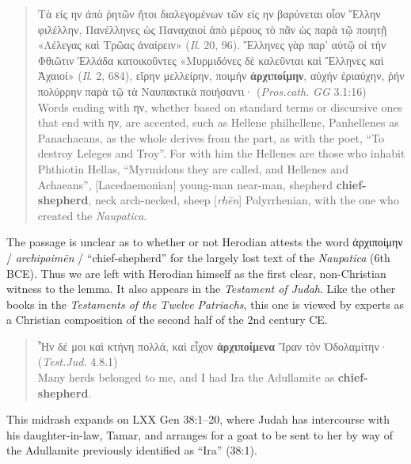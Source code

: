 \vspace*{4mm} 
 \begin{quote} Τὰ εἰς ην ἀπὸ ῥητῶν ἤτοι διαλεγομένων τῶν εἰς ην βαρύνεται %
 οἷον Ἕλλην φιλέλλην, Πανέλληνες ὡς Παναχαιοί ἀπὸ μέρους τὸ %
 πᾶν ὡς παρὰ τῷ ποιητῇ «Λέλεγας καὶ Τρῶας ἀναίρειν» (\textit{Il}. 20, 96).
 Ἕλληνες γὰρ παρ’ αὐτῷ οἱ τὴν Φθιῶτιν Ἑλλάδα κατοικοῦντες %
 «Μυρμιδόνες δὲ καλεῦνται καὶ Ἕλληνες καὶ Ἀχαιοί» (\textit{Il}. 2, 684), %
 εἴρην μελλείρην, ποιμήν \textbf{ἀρχιποίμην}, αὐχήν ἐριαύχην, %
 ῥήν πολύρρην παρὰ τῷ τὰ Ναυπακτικὰ ποιήσαντι· (\textit{Pros.cath.} \textit{GG} 3.1:16) \\[2mm] %
 Words ending with ην, whether based on standard terms or discursive ones %
 that end with ην, are accented, such as Hellene philhellene, %
 Panhellenes as Panachaeans, as the whole derives from the part, %
 as with the poet, “To destroy Leleges and Troy”. %
 For with him the Hellenes are those who inhabit Phthiotin Hellas, %
 “Myrmidons they are called, and Hellenes and Achaeans”, %
 [Lacedaemonian] young-man near-man, shepherd \textbf{chief-shepherd}, neck arch-necked, %
 sheep [\textit{rhēn}] Polyrrhenian, with the one who created the \textit{Naupatica}.\end{quote} %
 \vspace*{4mm}

The passage is unclear as to whether or not Herodian attests the word ἀρχιποίμην / \textit{archipoimēn} / “chief-shepherd” %
for the largely lost text of the \textit{Naupatica} (6th BCE). %
Thus we are left with Herodian himself as the first clear, non-Christian witness to the lemma. %
It also appears in the \textit{Testament of Judah}. %
Like the other books in the \textit{Testaments of the Twelve Patriachs}, %
this one is viewed by experts as a Christian composition of the second half of the 2nd century CE. %
\clearpage

 \begin{quote}Ἦν δέ μοι καὶ κτήνη πολλά, %
 καὶ εἶχον \textbf{ἀρχιποίμενα} Ἵραν τὸν Ὀδολαμίτην· (\textit{Test.Jud.} 4.8.1) \\[0.4mm] %
 Many herds belonged to me, 
 and I had Ira the Adullamite as \textbf{chief-shepherd}. \end{quote} %
 \vspace*{3mm}

\noindent{}This midrash expands on LXX Gen 38:1--20, %
where Judah has intercourse with his daughter-in-law, Tamar, %
and arranges for a goat to be sent to her by way of the %
Adullamite previously identified as “Ira” (38:1). %


